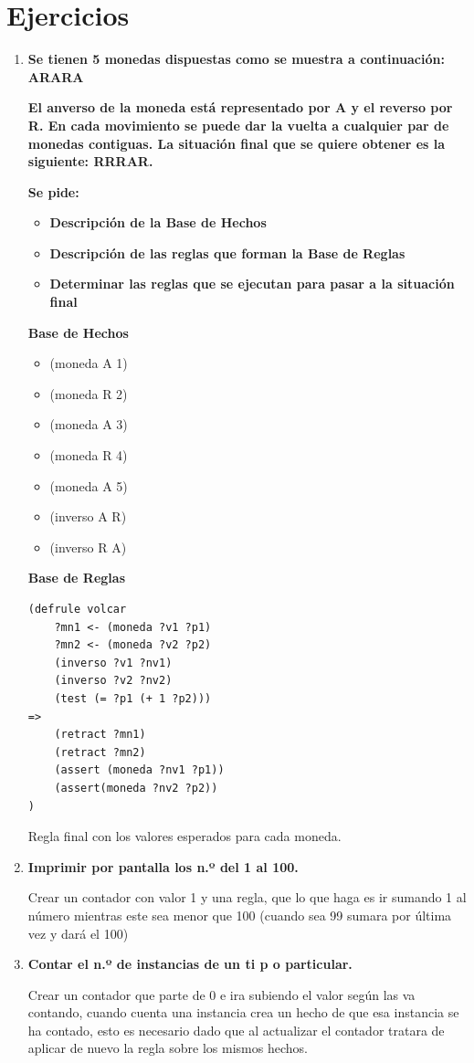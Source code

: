\documentclass[12pt, twoside, openright]{report} %
\begin{document}
\section{Ejercicios}
\begin{enumerate}
	\item \textbf{Se tienen 5 monedas dispuestas como se muestra a continuación: ARARA}
	
	\textbf{El anverso de la moneda está representado por A y el reverso por R. En cada movimiento se puede dar la vuelta a cualquier par de monedas contiguas. La situación final que se quiere obtener es la siguiente: RRRAR.} 
	
	\textbf{Se pide:}
	\begin{itemize}
		\item \textbf{Descripción de la Base de Hechos}
		\item \textbf{Descripción de las reglas que forman la Base de Reglas}
		\item \textbf{Determinar las reglas que se ejecutan para pasar a la situación final}
	\end{itemize}
	\textbf{Base de Hechos}
	\begin{itemize}
		\item (moneda A 1)
		\item (moneda R 2)
		\item (moneda A 3)
		\item (moneda R 4)
		\item (moneda A 5)
		\item (inverso A R)
		\item (inverso R A)
	\end{itemize}
	\textbf{Base de Reglas}
\begin{lstlisting}
(defrule volcar
	?mn1 <- (moneda ?v1 ?p1)
	?mn2 <- (moneda ?v2 ?p2)
	(inverso ?v1 ?nv1)
	(inverso ?v2 ?nv2)
	(test (= ?p1 (+ 1 ?p2)))
=>
	(retract ?mn1)
	(retract ?mn2)
	(assert (moneda ?nv1 ?p1))
	(assert(moneda ?nv2 ?p2))
)	
\end{lstlisting}

	Regla final con los valores esperados para cada moneda.

	\item \textbf{Imprimir por pantalla los n.º del 1 al 100.}
	
	Crear un contador con valor 1 y una regla, que lo que haga es ir sumando 1 al número mientras este sea menor que 100 (cuando sea 99 sumara por última vez y dará el 100)
	\item \textbf{Contar el n.º de instancias de un ti p o particular.}
	
	Crear un contador que parte de 0 e ira subiendo el valor según las va contando, cuando cuenta una instancia crea un hecho de que esa instancia se ha contado, esto es necesario dado que al actualizar el contador tratara de aplicar de nuevo la regla sobre los mismos hechos.
\end{enumerate}
\end{document}
